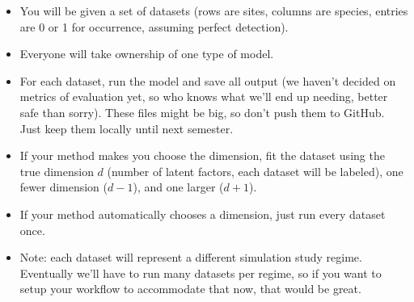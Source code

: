 \documentclass[12pt]{amsart}
\begin{document}
\begin{itemize}
\item You will be given a set of datasets (rows are sites, columns are species, entries are 0 or 1 for occurrence, assuming perfect detection). 

\item Everyone will take ownership of one type of model. 

\item  For each dataset, run the model and save all output (we haven't decided on metrics of evaluation yet, so who knows what we'll end up needing, better safe than sorry). These files might be big, so don't push them to GitHub. Just keep them locally until next semester.

\item  If your method makes you choose the dimension, fit the dataset using the true dimension $d$ (number of latent factors, each dataset will be labeled), one fewer dimension ($d-1$), and one larger ($d+1$).

\item  If your method automatically chooses a dimension, just run every dataset once. 

\item  Note: each dataset will represent a different simulation study regime. Eventually we'll have to run many datasets per regime, so if you want to setup your workflow to accommodate that now, that would be great.
\end{itemize}
\end{document}
